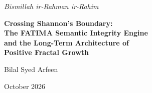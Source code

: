 \documentclass[11pt,a4paper]{article}
\begin{document}
\thispagestyle{empty}
\vspace*{-1.5cm}
\begin{center}
{\Large\textcolor{bismillahgreen}{\textit{Bismillah ir-Rahman ir-Rahim}}}

\vspace{1.5em}

{\LARGE\bfseries Crossing Shannon's Boundary:\\[0.3em]
The FATIMA Semantic Integrity Engine\\[0.3em]
and the Long-Term Architecture of\\[0.3em]
Positive Fractal Growth}

\vspace{1em}

{\large Bilal Syed Arfeen}

\vspace{0.5em}

{\normalsize October 2026}

\vspace{1.5em}
\end{center}
\end{document}
